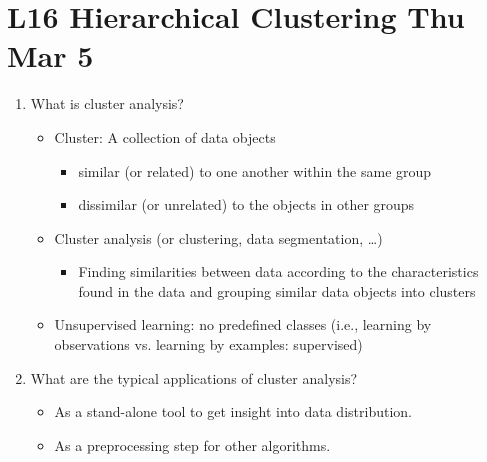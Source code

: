 \documentclass[12pt]{article}
\newenvironment{QandA}{\begin{enumerate}[label=\bfseries\arabic*.]\bfseries}
{\end{enumerate}}
\newenvironment{answered}{\par\normalfont\color{Sepia}}{}
\begin{document}
\section*{L16 Hierarchical Clustering \textemdash{} Thu Mar 5}
\begin{QandA}
    \item What is cluster analysis? 
    \begin{answered}
        \begin{itemize}
            \item Cluster: A collection of data objects
            \begin{itemize}
                \item similar (or related) to one another within the same group
                \item dissimilar (or unrelated) to the objects in other groups
            \end{itemize}
            \item Cluster analysis (or clustering, data segmentation, \ldots)
            \begin{itemize} 
                \item Finding similarities between data according to the characteristics found in the
                      data and grouping similar data objects into clusters
            \end{itemize}
            \item Unsupervised learning: no predefined classes 
                  (i.e., learning by observations vs. learning by examples: supervised)
        \end{itemize}
    \end{answered}

    \item What are the typical applications of cluster analysis? 
    \begin{answered}
        \begin{itemize}
            \item As a stand-alone tool to get insight into data distribution.
            \item As a preprocessing step for other algorithms.
        \end{itemize}
    \end{answered}


\end{QandA}
\end{document}
